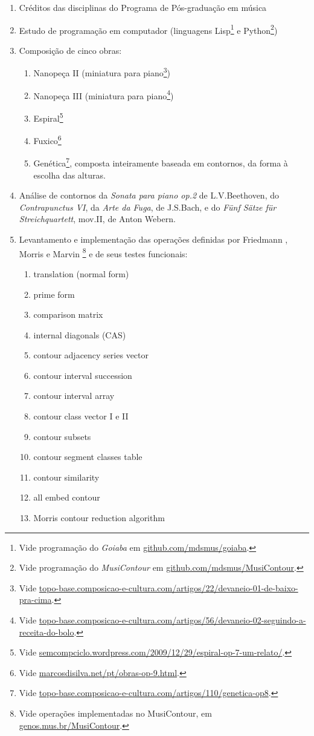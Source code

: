 \documentclass[12pt]{article}
\newcommand{\opus}[1]{\textit{#1}}
\begin{document}
\begin{enumerate}
\item Créditos das disciplinas do Programa de Pós-graduação em música
\item Estudo de programação em computador (linguagens
  Lisp\footnote{Vide programação do \textit{Goiaba} em
    \url{github.com/mdsmus/goiaba}.} e Python\footnote{Vide
    programação do \textit{MusiContour} em
    \url{github.com/mdsmus/MusiContour}.})
\item Composição de cinco obras:
\begin{enumerate}
\item Nanopeça II (miniatura para piano\footnote{Vide
    \url{topo-base.composicao-e-cultura.com/artigos/22/devaneio-01-de-baixo-pra-cima}.})
\item Nanopeça III (miniatura para piano\footnote{Vide
    \url{topo-base.composicao-e-cultura.com/artigos/56/devaneio-02-seguindo-a-receita-do-bolo}.})
\item Espiral\footnote{Vide
  \url{semcompciclo.wordpress.com/2009/12/29/espiral-op-7-um-relato/}.}
\item Fuxico\footnote{Vide
    \url{marcosdisilva.net/pt/obras-op-9.html}.}
\item Genética\footnote{Vide
    \url{topo-base.composicao-e-cultura.com/artigos/110/genetica-op8}.},
  composta inteiramente baseada em contornos, da forma à escolha das
  alturas.
\end{enumerate}
\item Análise de contornos da \opus{Sonata para piano op.2} de
  L.V.Beethoven, do \opus{Contrapunctus VI}, da \opus{Arte da Fuga},
  de J.S.Bach, e do \opus{Fünf Sätze für Streichquartett}, mov.II, de
  Anton Webern.
\item Levantamento e implementação das operações definidas por
  Friedmann \cite{friedmann85:methodology}, Morris
  \cite{morris93:directions} e Marvin
  \cite{marvin.ea87:relating}\footnote{Vide operações implementadas no
    MusiContour, em \url{genos.mus.br/MusiContour}.} e de seus testes
  funcionais:
  \begin{enumerate}
  \item translation (normal form)
  \item prime form
  \item comparison matrix
  \item internal diagonals (CAS)
  \item contour adjacency series vector
  \item contour interval succession
  \item contour interval array
  \item contour class vector I e II
  \item contour subsets
  \item contour segment classes table
  \item contour similarity
  \item all embed contour
  \item Morris contour reduction algorithm
  \end{enumerate}
\end{enumerate}
\end{document}
